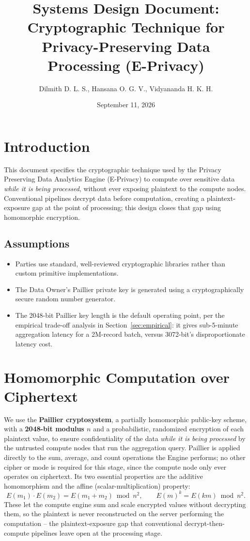 \documentclass[11pt]{article}
\title{Systems Design Document: Cryptographic Technique for Privacy-Preserving Data Processing (E-Privacy)}
\author{Dilmith D. L. S., Hansana O. G. V., Vidyananda H. K. H.}
\date{September 11, 2026}
\begin{document}
\maketitle

\section{Introduction}
This document specifies the cryptographic technique used by the Privacy Preserving Data Analytics Engine (E-Privacy) to compute over sensitive data \emph{while it is being processed}, without ever exposing plaintext to the compute nodes. Conventional pipelines decrypt data before computation, creating a plaintext-exposure gap at the point of processing; this design closes that gap using homomorphic encryption.

\subsection{Assumptions}
\begin{itemize}[leftmargin=1.5em]
    \item[B1.] Parties use standard, well-reviewed cryptographic libraries rather than custom primitive implementations.
    \item[B2.] The Data Owner's Paillier private key is generated using a cryptographically secure random number generator.
    \item[B3.] The 2048-bit Paillier key length is the default operating point, per the empirical trade-off analysis in Section~\ref{sec:empirical}: it gives sub-5-minute aggregation latency for a 2M-record batch, versus 3072-bit's disproportionate latency cost.
\end{itemize}

\section{Homomorphic Computation over Ciphertext}
We use the \textbf{Paillier cryptosystem}, a partially homomorphic public-key scheme, with a \textbf{2048-bit modulus $n$} and a probabilistic, randomized encryption of each plaintext value, to ensure confidentiality of the data \emph{while it is being processed} by the untrusted compute nodes that run the aggregation query. Paillier is applied directly to the sum, average, and count operations the Engine performs; no other cipher or mode is required for this stage, since the compute node only ever operates on ciphertext. Its two essential properties are the additive homomorphism and the affine (scalar-multiplication) property:
\[
E(m_1) \cdot E(m_2) = E(m_1 + m_2) \bmod n^2, \qquad E(m)^k = E(km) \bmod n^2.
\]
These let the compute engine sum and scale encrypted values without decrypting them, so the plaintext is never reconstructed on the server performing the computation -- the plaintext-exposure gap that conventional decrypt-then-compute pipelines leave open at the processing stage.
\end{document}
